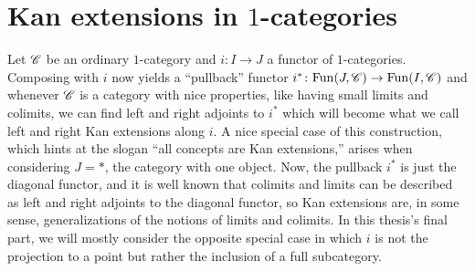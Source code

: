 \documentclass[../../thesis.tex]{subfiles}
\begin{document}
\section{Kan extensions in $1$-categories}
Let $\mathscr{C}$ be an ordinary $1$-category and $i \colon I \to J$ a functor of $1$-categories.
Composing with $i$ now yields a ``pullback'' functor $ i^* \colon \mathrm{Fun}(J, \mathscr{C}) \to \mathrm{Fun}(I, \mathscr{C})$ and whenever $\mathscr{C}$ is a category with nice properties, like having small limits and colimits, we can find left and right adjoints to $i^*$ which will become what we call left and right Kan extensions along $i$.
A nice special case of this construction, which hints at the slogan ``all concepts are Kan extensions,'' arises when considering $J = *$, the category with one object.
Now, the pullback $i^*$ is just the diagonal functor, and it is well known that colimits and limits can be described as left and right adjoints to the diagonal functor, so Kan extensions are, in some sense, generalizations of the notions of limits and colimits.
In this thesis's final part, we will mostly consider the opposite special case in which $i$ is not the projection to a point but rather the inclusion of a full subcategory.
\end{document}

